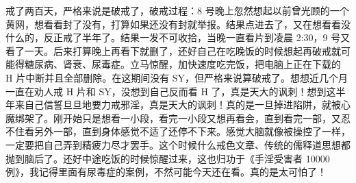 \begin{case}
    戒了两百天，严格来说是破戒了，破戒过程：8 号晚上忽然想起以前曾光顾的一个黄网，想看看封了没有，打算如果还没有封就举报。结果点进去了，又在想看看没什么的，反正戒了半年了。结果一发不可收拾，当晚一直看片到凌晨 2:30，9 号又看了一天。后来打算晚上再看下就删了，还好自己在吃晚饭的时候想起再破戒就可能得糖尿病、肾衰、尿毒症。立马惊醒，加快速度吃完饭，把电脑上正在下载的 H 片中断并且全部删除。在这期间没有 SY，但严格来说算破戒了。想想近几个月一直在劝人戒 H 片和 SY，没想到自己反而看 H 了，真是天大的讽刺！想到这半年来自己信誓旦旦地要力戒邪淫，真是天大的讽刺！真的是一旦掉进陷阱，就被心魔绑架了。刚开始只是想看一小段，看完一小段又想再看会，直到看完一部，又忍不住看另外一部，直到身体感觉不适了还停不下来。感觉大脑就像被操控了一样，一定要把自己弄到精疲力尽才罢手。这个时候什么戒色文章、传统的儒释道思想都抛到脑后了。还好中途吃饭的时候惊醒过来，这也归功于《手淫受害者 10000 例》，我记得里面有尿毒症的案例，不然可能今天还在看。真的是太可怕了！


\end{case}
